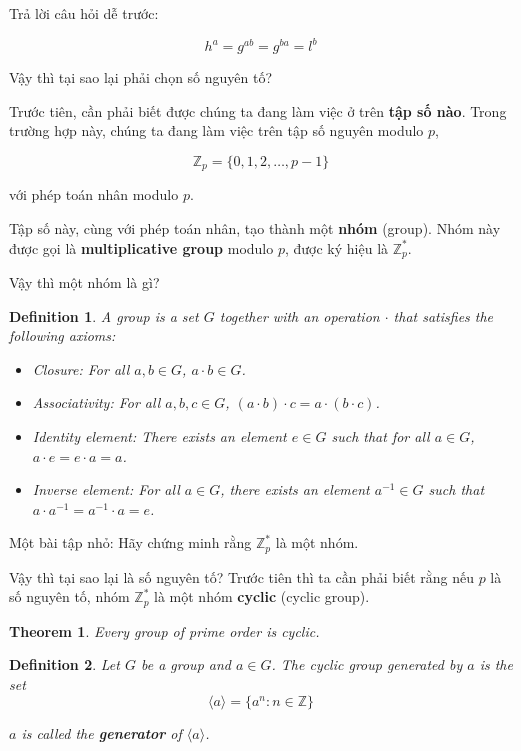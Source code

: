 \documentclass[a4paper,12pt]{article}
\newtheorem{theorem}{Theorem}[section]
\newtheorem{definition}{Definition}[section]
\newenvironment{ftheorem}
    {\begin{mdframed}\begin{theorem}}
    {\end{theorem}\end{mdframed}}
\newenvironment{fdefinition}
    {\begin{mdframed}\begin{definition}}
    {\end{definition}\end{mdframed}}
\begin{document}
Trả lời câu hỏi dễ trước:

\[
    h^a = g^{ab} = g^{ba} = l^b
\]

Vậy thì tại sao lại phải chọn số nguyên tố?

Trước tiên, cần phải biết được chúng ta đang làm việc ở trên \textbf{tập số nào}.
Trong trường hợp này, chúng ta đang làm việc trên tập số nguyên modulo $p$,

\[
    \mathbb{Z}_p = \{0, 1, 2, \ldots, p-1\}
\]

với phép toán nhân modulo $p$.

Tập số này, cùng với phép toán nhân, tạo thành một \textbf{nhóm} (group).
Nhóm này được gọi là \textbf{multiplicative group} modulo $p$,
được ký hiệu là $\mathbb{Z}_p^*$.

Vậy thì một nhóm là gì?

\begin{fdefinition}
    A group is a set $G$ together with an operation $\cdot$ that satisfies the following axioms:
    \begin{itemize}
        \item Closure: For all $a, b \in G$, $a \cdot b \in G$.
        \item Associativity: For all $a, b, c \in G$, $(a \cdot b) \cdot c = a \cdot (b \cdot c)$.
        \item Identity element: There exists an element $e \in G$ such that for all $a \in G$, $a \cdot e = e \cdot a = a$.
        \item Inverse element: For all $a \in G$, there exists an element $a^{-1} \in G$ such that $a \cdot a^{-1} = a^{-1} \cdot a = e$.
    \end{itemize}
\end{fdefinition}

Một bài tập nhỏ: Hãy chứng minh rằng $\mathbb{Z}_p^*$ là một nhóm.

Vậy thì tại sao lại là số nguyên tố? Trước tiên thì ta cần phải biết rằng nếu $p$ là số nguyên tố,
nhóm $\mathbb{Z}_p^*$ là một nhóm \textbf{cyclic} (cyclic group).

\begin{ftheorem}
    Every group of prime order is cyclic.
\end{ftheorem}

\begin{fdefinition}
    Let $G$ be a group and $a \in G$. The cyclic group generated by $a$ is the set
    \[
        \langle a \rangle = \{a^n : n \in \mathbb{Z}\}
    \]

    $a$ is called the \textbf{generator} of $\langle a \rangle$.
\end{fdefinition}
\end{document}
